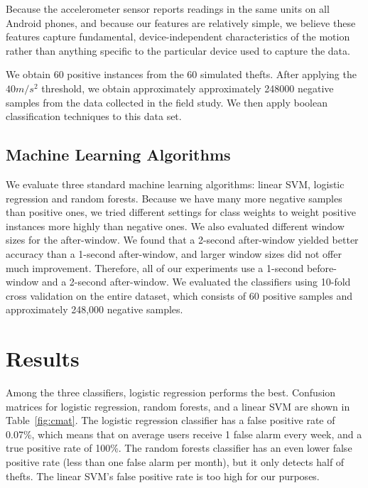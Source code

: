 Because the accelerometer sensor reports readings in the same units on all Android phones, and because our features are relatively simple, we believe these features capture fundamental, device-independent characteristics of the motion rather than anything specific to the particular device used to capture the data.

We obtain 60 positive instances from the 60 simulated thefts.
After applying the~$40 m/s^2$ threshold, we obtain approximately approximately 248000 negative samples from the data collected in the field study. 
We then apply boolean classification techniques to this data set.





\subsection{Machine Learning Algorithms}
We evaluate three standard machine learning algorithms: linear SVM, logistic regression and random forests.
Because we have many more negative samples than positive ones, we tried different settings for class weights to weight positive instances more highly than negative ones.
We also evaluated different window sizes for the after-window.
We found that a 2-second after-window yielded better accuracy than a 1-second after-window, and larger window sizes did not offer much improvement.
Therefore, all of our experiments use a 1-second before-window and a 2-second after-window.
We evaluated the classifiers using 10-fold cross validation on the entire dataset, which consists of 60 positive samples and approximately 248,000 negative samples. 



\section{Results}
Among the three classifiers, logistic regression performs the best.
Confusion matrices for logistic regression, random forests, and a linear SVM
are shown in Table~\ref{fig:cmat}.
The logistic regression classifier has a false positive rate of 0.07\%, which means that on average users receive 1 false alarm every week, and a true positive rate of 100\%.
The random forests classifier has an even lower false positive rate (less than one false alarm per month),
but it only detects half of thefts.
The linear SVM's false positive rate is too high for our purposes.


